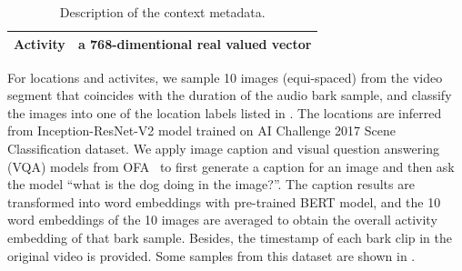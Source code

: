 \begin{table}[th]
\begin{tabular}{p{}|p{}}
Activity & a 768-dimentional real valued vector \\ 
\bottomrule
\end{tabular}
\caption{Description of the context metadata. %
}
\label{tab:context}
\end{table}


For locations and activites, we sample 10 images (equi-spaced) from the video segment that 
coincides with the duration of the audio bark sample, and classify the images into one of the location labels listed in . The locations are inferred from Inception-ResNet-V2 model\cite{szegedy2017inception} trained on AI Challenge 2017 Scene Classification dataset. We apply image caption and visual question answering (VQA) models from OFA~\cite{wang2022unifying} to first generate a caption for an image and then ask the model ``what is the dog doing in the image?''. The caption results are transformed into word embeddings with pre-trained BERT model\cite{devlin2018bert}, and the 10 word embeddings of the 10 images are averaged to obtain the overall activity embedding of that bark sample. Besides, the timestamp of each bark clip in the original video is provided. Some samples from this dataset are shown in .




